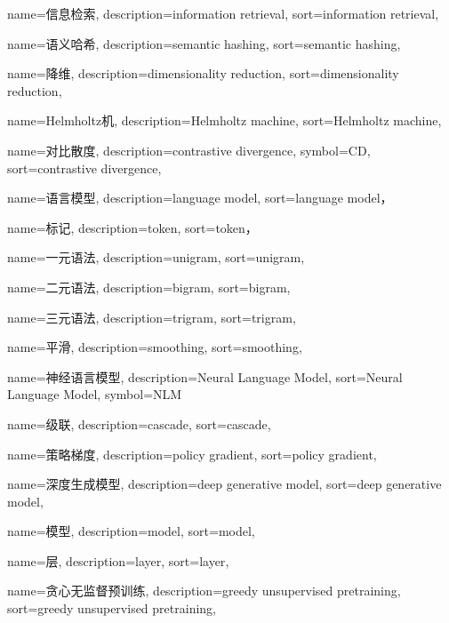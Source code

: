 {
  name=信息检索,
  description={information retrieval},
  sort={information retrieval},
}

{
  name=语义哈希,
  description={semantic hashing},
  sort={semantic hashing},
}

{
  name=降维,
  description={dimensionality reduction},
  sort={dimensionality reduction},
}

{
  name=Helmholtz机,
  description={Helmholtz machine},
  sort={Helmholtz machine},
}


{
  name=对比散度,
  description={contrastive divergence},
  symbol={CD},
  sort={contrastive divergence},
}

{
  name=语言模型,
  description={language model},
  sort={language model}，
}

{
  name=标记,
  description={token},
  sort={token}，
}

{
  name=一元语法,
  description={unigram},
  sort={unigram},
}

{
  name=二元语法,
  description={bigram},
  sort={bigram},
}

{
  name=三元语法,
  description={trigram},
  sort={trigram},
}

{
  name=平滑,
  description={smoothing},
  sort={smoothing},
}

{
  name=神经语言模型,
  description={Neural Language Model},
  sort={Neural Language Model},
  symbol={NLM}
}

{
  name=级联,
  description={cascade},
  sort={cascade},
}

{
  name=策略梯度,
  description={policy gradient},
  sort={policy gradient},
}

{
  name=深度生成模型,
  description={deep generative model},
  sort={deep generative model},
}

{
  name=模型,
  description={model},
  sort={model},
}

{
  name=层,
  description={layer},
  sort={layer},
}

{
  name=贪心无监督预训练,
  description={greedy unsupervised pretraining},
  sort={greedy unsupervised pretraining},
}

